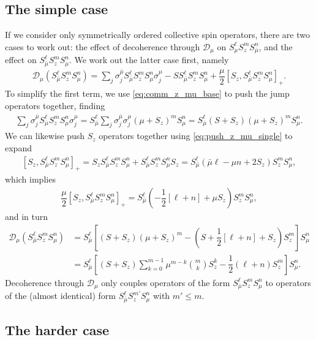 \documentclass[aps,notitlepage,nofootinbib,11pt]{revtex4-1}
\newcommand{\f}[2]{\dfrac{#1}{#2}} %
\newcommand{\p}[1]{\left(#1\right)} %
\renewcommand{\sp}[1]{\left[#1\right]} %
\newcommand{\D}{\mathcal{D}}
\newcommand{\bmu}{{\bar\mu}}
\newcommand{\1}{\mathds{1}}
\begin{document}
\subsection{The simple case}

If we consider only symmetrically ordered collective spin operators,
there are two cases to work out: the effect of decoherence through
$\D_\mu$ on $S_\mu^\ell S_z^m S_\bmu^n$, and the effect on
$S_\bmu^\ell S_z^m S_\mu^n$.  We work out the latter case first,
namely
\begin{align}
  \D_\mu\p{S_\bmu^\ell S_z^m S_\mu^n}
  = \sum_j\sigma_j^\bmu S_\bmu^\ell S_z^m S_\mu^n \sigma_j^\mu
  - S S_\bmu^\ell S_z^m S_\mu^n
  + \f{\mu}{2} \sp{S_z, S_\bmu^\ell S_z^m S_\mu^n}_+.
\end{align}
To simplify the first term, we use \eqref{eq:comm_z_mu_base} to push
the jump operators together, finding
\begin{align}
  \sum_j \sigma_j^\bmu S_\bmu^\ell S_z^m S_\mu^n \sigma_j^\mu
  = S_\bmu^\ell \sum_j \sigma_j^\bmu \sigma_j^\mu \p{\mu+S_z}^m S_\mu^n
  = S_\bmu^\ell \p{S+S_z} \p{\mu+S_z}^m S_\mu^n.
\end{align}
We can likewise push $S_z$ operators together using
\eqref{eq:push_z_mu_single} to expand
\begin{align}
  \sp{S_z, S_\bmu^\ell S_z^m S_\mu^n}_+
  = S_z S_\bmu^\ell S_z^m S_\mu^n + S_\bmu^\ell S_z^m S_\mu^n S_z
  = S_\bmu^\ell\p{\bmu\ell - \mu n + 2 S_z} S_z^m S_\mu^n,
\end{align}
which implies
\begin{align}
  \f{\mu}{2} \sp{S_z, S_\bmu^\ell S_z^m S_\mu^n}_+
  = S_\bmu^\ell\p{-\f12\sp{\ell+n} + \mu S_z} S_z^m S_\mu^n,
\end{align}
and in turn
\begin{align}
  \D_\mu\p{S_\bmu^\ell S_z^m S_\mu^n}
  &= S_\bmu^\ell \sp{\p{S+S_z} \p{\mu+S_z}^m
    - \p{S + \f12\sp{\ell+n} + S_z} S_z^m} S_\mu^n \\
  &= S_\bmu^\ell
  \sp{\p{S+S_z} \sum_{k=0}^{m-1} \mu^{m-k} { m \choose k} S_z^k
  - \f12\p{\ell+n} S_z^m} S_\mu^n.
\end{align}
Decoherence through $\D_\mu$ only couples operators of the form
$S_\bmu^\ell S_z^m S_\mu^n$ to operators of the (almost identical)
form $S_\bmu^\ell S_z^{m'} S_\mu^n$ with $m'\le m$.


\subsection{The harder case}
\end{document}
